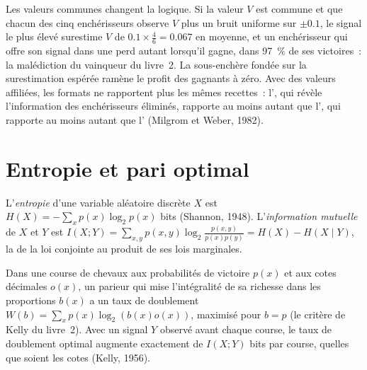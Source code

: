 Les valeurs communes changent la logique. Si la valeur $V$ est commune et que chacun des cinq enchérisseurs observe $V$ plus un bruit uniforme sur $\pm0.1$, le signal le plus élevé surestime $V$ de $0.1 \times \frac46 = 0.067$ en moyenne, et un enchérisseur
qui offre son signal dans une  perd autant lorsqu'il gagne, dans 97~\% de ses victoires~: la malédiction du vainqueur du livre~2. La sous-enchère fondée sur la surestimation espérée ramène le profit des gagnants à zéro. Avec
des valeurs affiliées, les formats ne rapportent plus les mêmes recettes~: l', qui révèle l'information des enchérisseurs éliminés, rapporte au moins autant que l', qui rapporte au moins autant que
l' (Milgrom et Weber, 1982).

\section{Entropie et pari optimal}

\begin{definition}\label{def:qm:games-auctions-and-information:entropy}
L'\emph{entropie} d'une variable aléatoire discrète $X$ est $H(X) = -\sum_xp(x)\log_2p(x)$ bits (Shannon, 1948). L'\emph{information mutuelle} de $X$ et $Y$ est $I(X; Y) =
\sum_{x,y}p(x, y)\log_2\frac{p(x, y)}{p(x)p(y)} = H(X) - H(X \mid Y)$, la  de la loi conjointe au produit de ses lois marginales.
\end{definition}

\begin{theorem}\label{thm:qm:games-auctions-and-information:kelly}
Dans une course de chevaux aux probabilités de victoire $p(x)$ et aux cotes décimales $o(x)$, un parieur qui mise l'intégralité de sa richesse dans les proportions $b(x)$ a un taux de doublement $W(b) = \sum_xp(x)\log_2(b(x)o(x))$, maximisé pour $b = p$ (le
critère de Kelly du livre~2). Avec un signal $Y$ observé avant chaque course, le taux de doublement optimal augmente exactement de $I(X; Y)$ bits par course, quelles que soient les cotes (Kelly, 1956).
\end{theorem}

